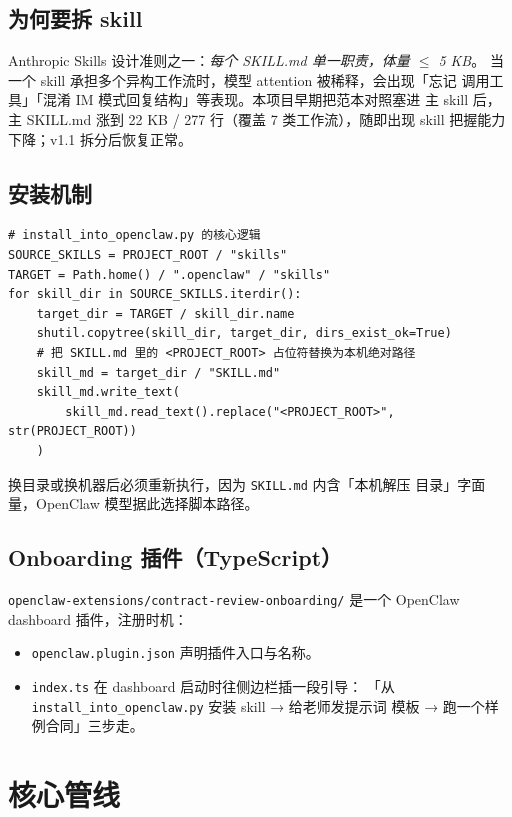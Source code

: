 \documentclass[11pt,a4paper]{article}
\begin{document}
\subsection{为何要拆 skill}

Anthropic Skills 设计准则之一：\emph{每个 SKILL.md 单一职责，体量 $\le$ 5 KB}。
当一个 skill 承担多个异构工作流时，模型 attention 被稀释，会出现「忘记
调用工具」「混淆 IM 模式回复结构」等表现。本项目早期把范本对照塞进
主 skill 后，主 SKILL.md 涨到 22 KB / 277 行（覆盖 7 类工作流），随即出现
skill 把握能力下降；v1.1 拆分后恢复正常。

\subsection{安装机制}

\begin{lstlisting}[style=py]
# install_into_openclaw.py 的核心逻辑
SOURCE_SKILLS = PROJECT_ROOT / "skills"
TARGET = Path.home() / ".openclaw" / "skills"
for skill_dir in SOURCE_SKILLS.iterdir():
    target_dir = TARGET / skill_dir.name
    shutil.copytree(skill_dir, target_dir, dirs_exist_ok=True)
    # 把 SKILL.md 里的 <PROJECT_ROOT> 占位符替换为本机绝对路径
    skill_md = target_dir / "SKILL.md"
    skill_md.write_text(
        skill_md.read_text().replace("<PROJECT_ROOT>", str(PROJECT_ROOT))
    )
\end{lstlisting}

换目录或换机器后必须重新执行，因为 \texttt{SKILL.md} 内含「本机解压
目录」字面量，OpenClaw 模型据此选择脚本路径。

\subsection{Onboarding 插件（TypeScript）}

\texttt{openclaw-extensions/contract-review-onboarding/} 是一个
OpenClaw dashboard 插件，注册时机：

\begin{itemize}[leftmargin=1.4em,itemsep=1pt]
  \item \texttt{openclaw.plugin.json} 声明插件入口与名称。
  \item \texttt{index.ts} 在 dashboard 启动时往侧边栏插一段引导：
    「从 \texttt{install\_into\_openclaw.py} 安装 skill → 给老师发提示词
    模板 → 跑一个样例合同」三步走。
\end{itemize}

\section{核心管线}
\end{document}
